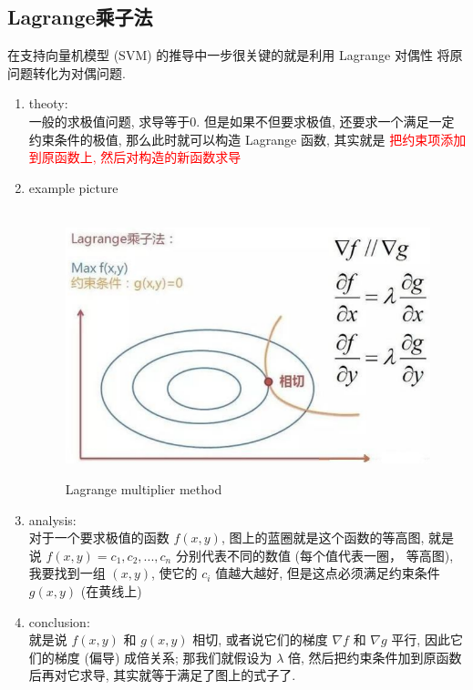 \documentclass[oneside, 12pt]{ctexbook}
\begin{document}
			\subsection{\quad Lagrange乘子法}
				在支持向量机模型 (SVM) 的推导中一步很关键的就是利用 Lagrange 对偶性 将原问题转化为对偶问题.
				\begin{enumerate}
					\item theoty: \\
						一般的求极值问题, 求导等于0. 但是如果不但要求极值, 还要求一个满足一定约束条件的极值, 那么此时就可以构造 Lagrange 函数, 其实就是 \textcolor{red}{把约束项添加到原函数上, 然后对构造的新函数求导}
						
					\item example picture
						\begin{figure}[H]
							\vspace{-0.6cm}  %
							\setlength{\abovecaptionskip}{-0.2cm}   %
							\centering
							\includegraphics[scale=0.6]{Lagrange_multiplier.png}
							\renewcommand{\figurename}{Fig} %
							\caption{Lagrange multiplier method}
							\label{fig:9}
						\end{figure}
					
					\item analysis: \\
					对于一个要求极值的函数 $f(x, y)$, 图上的蓝圈就是这个函数的等高图, 就是说 $f(x, y) = c_1, c_2, ..., c_n$ 分别代表不同的数值 (每个值代表一圈， 等高图), 我要找到一组 $(x, y)$, 使它的 $c_i$ 值越大越好, 但是这点必须满足约束条件 $g(x, y)$ (在黄线上)
					
					\item conclusion: \\
					就是说 $f(x, y)$ 和 $g(x, y)$ 相切, 或者说它们的梯度 $\nabla f$ 和 $\nabla g$ 平行, 因此它们的梯度 (偏导) 成倍关系; 那我们就假设为 $\lambda$ 倍, 然后把约束条件加到原函数后再对它求导, 其实就等于满足了图上的式子了.
				\end{enumerate}
\end{document}
